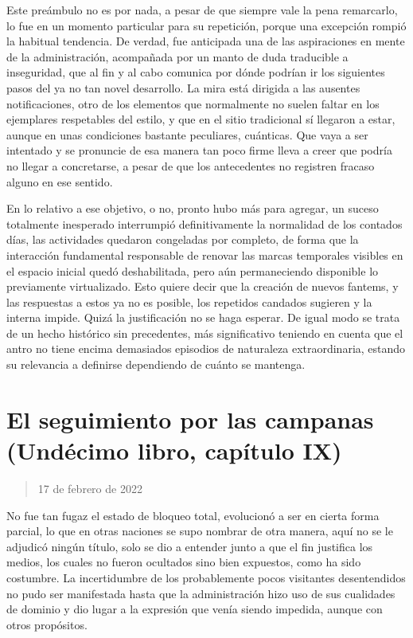 \documentclass[
]{book}
\begin{document}
Este preámbulo no es por nada, a pesar de que siempre vale la pena remarcarlo, lo fue en un momento particular para su repetición, porque una excepción rompió la habitual tendencia. De verdad, fue anticipada una de las aspiraciones en mente de la administración, acompañada por un manto de duda traducible a inseguridad, que al fin y al cabo comunica por dónde podrían ir los siguientes pasos del ya no tan novel desarrollo. La mira está dirigida a las ausentes notificaciones, otro de los elementos que normalmente no suelen faltar en los ejemplares respetables del estilo, y que en el sitio tradicional sí llegaron a estar, aunque en unas condiciones bastante peculiares, cuánticas. Que vaya a ser intentado y se pronuncie de esa manera tan poco firme lleva a creer que podría no llegar a concretarse, a pesar de que los antecedentes no registren fracaso alguno en ese sentido.

En lo relativo a ese objetivo, o no, pronto hubo más para agregar, un suceso totalmente inesperado interrumpió definitivamente la normalidad de los contados días, las actividades quedaron congeladas por completo, de forma que la interacción fundamental responsable de renovar las marcas temporales visibles en el espacio inicial quedó deshabilitada, pero aún permaneciendo disponible lo previamente virtualizado. Esto quiere decir que la creación de nuevos fantems, y las respuestas a estos ya no es posible, los repetidos candados sugieren y la interna impide. Quizá la justificación no se haga esperar. De igual modo se trata de un hecho histórico sin precedentes, más significativo teniendo en cuenta que el antro no tiene encima demasiados episodios de naturaleza extraordinaria, estando su relevancia a definirse dependiendo de cuánto se mantenga.

\hypertarget{el-seguimiento-por-las-campanas-unduxe9cimo-libro-capuxedtulo-ix}{%
\section{El seguimiento por las campanas (Undécimo libro, capítulo IX)}\label{el-seguimiento-por-las-campanas-unduxe9cimo-libro-capuxedtulo-ix}}

\begin{quote}
17 de febrero de 2022
\end{quote}

No fue tan fugaz el estado de bloqueo total, evolucionó a ser en cierta forma parcial, lo que en otras naciones se supo nombrar de otra manera, aquí no se le adjudicó ningún título, solo se dio a entender junto a que el fin justifica los medios, los cuales no fueron ocultados sino bien expuestos, como ha sido costumbre. La incertidumbre de los probablemente pocos visitantes desentendidos no pudo ser manifestada hasta que la administración hizo uso de sus cualidades de dominio y dio lugar a la expresión que venía siendo impedida, aunque con otros propósitos.
\end{document}

